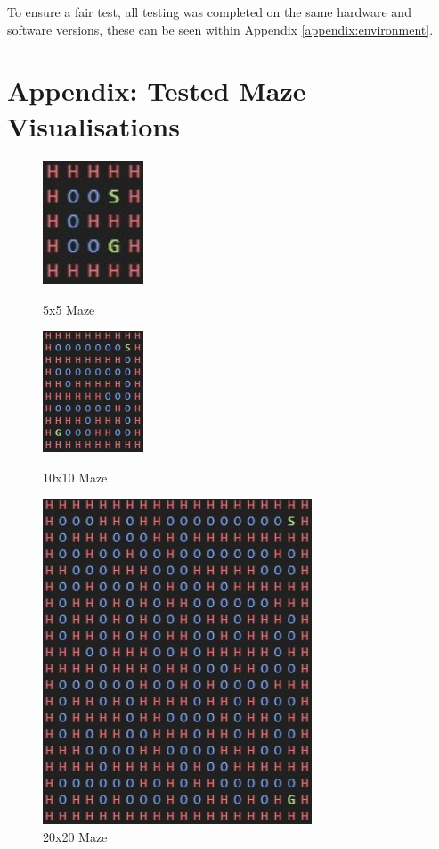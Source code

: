 \documentclass[twoside, 12pt, a4paper]{article}
\begin{document}
To ensure a fair test, all testing was completed on the same hardware and software versions, these can be seen within Appendix \ref{appendix:environment}.
\newpage




\newpage
\appendix
\section{Appendix: Tested Maze Visualisations} \label{appendix:mazes}

\begin{figure}[ht]
\begin{center}
\includegraphics[width=3cm]{5x5.jpg}
\caption{\label{tab:table-name}5x5 Maze}

\includegraphics[width=3cm]{10x10.jpg} 
\caption{\label{tab:table-name}10x10 Maze}

\includegraphics[width=8cm]{20x20.jpg} 
\caption{\label{tab:table-name}20x20 Maze}
\end {center}
\end{figure}
\end{document}
